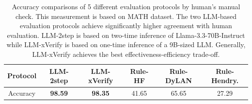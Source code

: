 \documentclass{article}
\begin{document}
\medskip
{
\small


}



\newpage
\appendix

\begin{table}[t]
    \centering
    \begin{tabular}{c|ccccc}
        \toprule
        Protocol & LLM-2step & LLM-xVerify & Rule-HF & Rule-DyLAN & Rule-Hendry. \\
        \midrule
        Accuracy & \textbf{98.59} & \textbf{98.35} & 41.65 & 65.65 & 27.29 \\
        \bottomrule
    \end{tabular}
    \caption{Accuracy comparisons of 5 different evaluation protocols by human's manual check. This measurement is based on MATH dataset. The two LLM-based evaluation protocols achieve significantly higher agreement with human evaluation. LLM-2step is based on two-time inference of Llama-3.3-70B-Instruct while LLM-xVerify is based on one-time inference of a 9B-sized LLM. Generally, LLM-xVerify achieves the best effectiveness-efficiency trade-off.}
    \label{tab:evaluation_acc}
\end{table}
\end{document}
